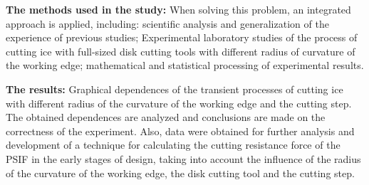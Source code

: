 \textbf{The methods used in the study:} When solving this problem, an integrated approach is applied, including: scientific analysis and generalization of the experience of previous studies; Experimental laboratory studies of the process of cutting ice with full-sized disk cutting tools with different radius of curvature of the working edge; mathematical and statistical processing of experimental results.

\textbf{The results:} Graphical dependences of the transient processes of cutting ice with different radius of the curvature of the working edge and the cutting step. The obtained dependences are analyzed and conclusions are made on the correctness of the experiment. Also, data were obtained for further analysis and development of a technique for calculating the cutting resistance force of the PSIF in the early stages of design, taking into account the influence of the radius of the curvature of the working edge, the disk cutting tool and the cutting step.